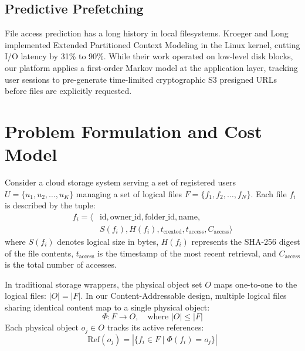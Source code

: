 \documentclass[conference]{IEEEtran}
\begin{document}
\subsection{Predictive Prefetching}
File access prediction has a long history in local filesystems. Kroeger and Long \cite{kroeger2001} implemented Extended Partitioned Context Modeling in the Linux kernel, cutting I/O latency by 31\% to 90\%. While their work operated on low-level disk blocks, our platform applies a first-order Markov model at the application layer, tracking user sessions to pre-generate time-limited cryptographic S3 presigned URLs before files are explicitly requested.

\section{Problem Formulation and Cost Model}
Consider a cloud storage system serving a set of registered users $U = \{u_1, u_2, \dots, u_K\}$ managing a set of logical files $F = \{f_1, f_2, \dots, f_N\}$. Each file $f_i$ is described by the tuple:
\begin{equation}
\begin{aligned}
f_i = \langle & \text{id}, \text{owner\_id}, \text{folder\_id}, \text{name}, \\
& S(f_i), H(f_i), t_{\text{created}}, t_{\text{access}}, C_{\text{access}} \rangle
\end{aligned}
\end{equation}
where $S(f_i)$ denotes logical size in bytes, $H(f_i)$ represents the SHA-256 digest of the file contents, $t_{\text{access}}$ is the timestamp of the most recent retrieval, and $C_{\text{access}}$ is the total number of accesses.

In traditional storage wrappers, the physical object set $O$ maps one-to-one to the logical files: $|O| = |F|$. In our Content-Addressable design, multiple logical files sharing identical content map to a single physical object:
\begin{equation}
\Phi: F \longrightarrow O, \quad \text{where } |O| \le |F|
\end{equation}
Each physical object $o_j \in O$ tracks its active references:
\begin{equation}
\text{Ref}(o_j) = |\{ f_i \in F \mid \Phi(f_i) = o_j \}|
\end{equation}
\end{document}

